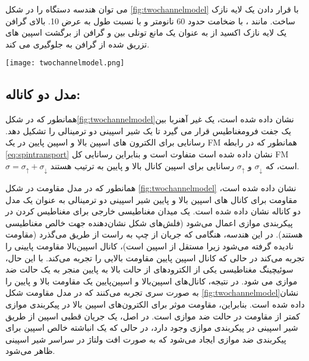 می توان هندسه دستگاه را در شکل \ref{fig:twochannelmodel} با قرار دادن یک لایه نازک  ساخت. مانند ، با ضخامت حدود 60 نانومتر و با نسبت طول به عرض 10. بالای گرافن یک لایه نازک اکسید از  به عنوان یک مانع تونلی بین  و گرافن از برگشت اسپین های تزریق شده از گرافن به  جلوگیری می کند.
\begin{figure*}[!ht]
    \centering
    \texttt{[image: twochannelmodel.png]}
    \caption{یک شیر اسپینی دو ترمینالی در شکل بالا با یک جفت FM که یک NM را ساندویچ می کند نشان داده شده است. شکل پایین مدل دو کاناله مربوطه را برای کانال اسپین بالا و پایین برای یک شیر اسپین دو ترمینالی نشان می دهد.}
    \label{fig:twochannelmodel}
\end{figure*}
\subsection{مدل دو کاناله:}
همانطور که در شکل\ref{fig:twochannelmodel}نشان داده شده است، یک غیر آهنربا  بین یک جفت فرومغناطیس  قرار می گیرد تا یک شیر اسپینی دو ترمینالی را تشکیل دهد. رسانایی برای الکترون های اسپین بالا و اسپین پایین در یک FM همانطور که در رابطه \ref{eq:spintransport} نشان داده شده است متفاوت است و بنابراین رسانایی کل FM $\sigma=\sigma_{\uparrow}+\sigma_{\downarrow}$ است، که $\sigma_{\downarrow}$ و $\sigma_{\uparrow}$ رسانایی برای اسپین کانال بالا و پایین به ترتیب هستند.

همانطور که در مدل مقاومت در شکل \ref{fig:twochannelmodel} نشان داده شده است، مقاومت برای کانال های اسپین بالا و پایین شیر اسپینی دو ترمینالی به عنوان یک مدل دو کاناله نشان داده شده است. یک میدان مغناطیسی خارجی برای مغناطیس کردن  در پیکربندی موازی اعمال می‌شود (فلش‌های شکل نشان‌دهنده جهت خالص مغناطیسی  هستند). در این هندسه، هنگامی که جریان از  چپ به  راست از طریق  می‌گذرد (مقاومت  نادیده گرفته می‌شود زیرا مستقل از اسپین است)، کانال اسپین‌بالا مقاومت پایینی را تجربه می‌کند در حالی که کانال اسپین پایین مقاومت بالایی را تجربه می‌کند. با این حال، سوئیچینگ مغناطیسی یکی از الکترودهای  از حالت بالا به پایین منجر به یک حالت ضد موازی می شود. در نتیجه، کانال‌های اسپین‌بالا و اسپین‌پایین یک مقاومت بالا و پایین را به صورت سری تجربه می‌کنند که در مدل مقاومت شکل \ref{fig:twochannelmodel}نشان داده شده است. بنابراین، مقاومت موثر برای الکترون‌های اسپین بالا در پیکربندی موازی کمتر از مقاومت در حالت ضد موازی است. در اصل، یک جریان قطبی اسپین از طریق شیر اسپینی در پیکربندی موازی وجود دارد، در حالی که یک انباشته خالص اسپین برای پیکربندی ضد موازی ایجاد می‌شود که به صورت افت ولتاژ در سراسر شیر اسپینی ظاهر می‌شود.

